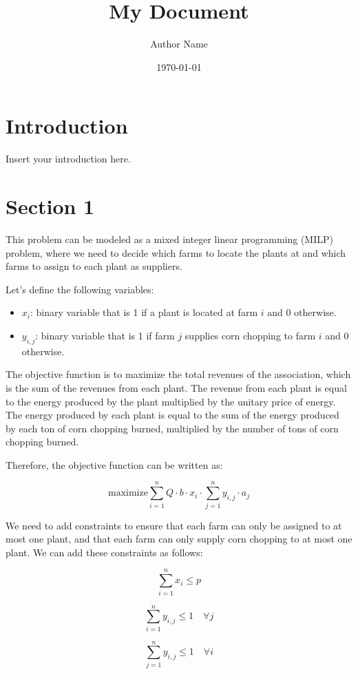 \documentclass{article}
\begin{document}
\title{My Document}
\author{Author Name}
\date{\today}
\maketitle

\section{Introduction}

Insert your introduction here.

\section{Section 1}

This problem can be modeled as a mixed integer linear programming (MILP) problem, where we need to decide which 
farms to locate the plants at and which farms to assign to each plant as suppliers.

Let's define the following variables:
\begin{itemize}
    \item $x_i$: binary variable that is 1 if a plant is located at farm $i$ and 0 otherwise.
    \item  $y_{i,j}$: binary variable that is 1 if farm $j$ supplies corn chopping to farm $i$ and 0 otherwise.
\end{itemize}

The objective function is to maximize the total revenues of the association, which is the sum of the revenues from each plant. The revenue from each plant is equal to the energy produced by the plant multiplied by the unitary price of energy. The energy produced by each plant is equal to the sum of the energy produced by each ton of corn chopping burned, multiplied by the number of tons of corn chopping burned.

Therefore, the objective function can be written as:

$$\text{maximize} \sum_{i=1}^n Q \cdot b \cdot x_i \cdot \sum_{j=1}^n y_{i,j} \cdot a_j$$

We need to add constraints to ensure that each farm can 
only be assigned to at most one plant, and that each farm can only supply corn chopping to at most one plant. We can add these constraints as follows:

$$\sum_{i=1}^n x_i \leq p$$

$$\sum_{i=1}^n y_{i,j} \leq 1 \quad \forall j$$

$$\sum_{j=1}^n y_{i,j} \leq 1 \quad \forall i$$
\end{document}
